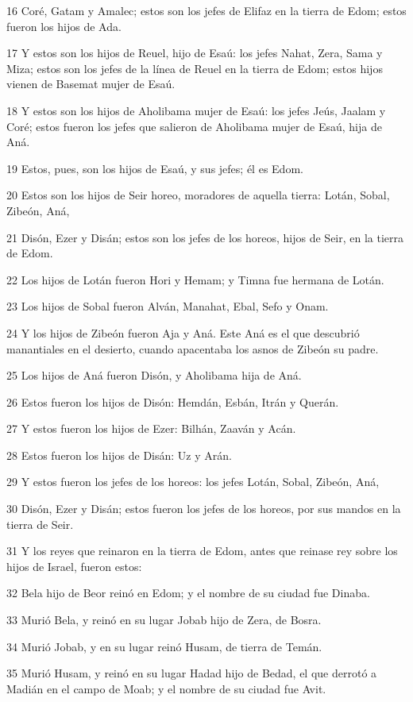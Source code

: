 \par 16 Coré, Gatam y Amalec; estos son los jefes de Elifaz en la tierra de Edom; estos fueron los hijos de Ada.
\par 17 Y estos son los hijos de Reuel, hijo de Esaú: los jefes Nahat, Zera, Sama y Miza; estos son los jefes de la línea de Reuel en la tierra de Edom; estos hijos vienen de Basemat mujer de Esaú.
\par 18 Y estos son los hijos de Aholibama mujer de Esaú: los jefes Jeús, Jaalam y Coré; estos fueron los jefes que salieron de Aholibama mujer de Esaú, hija de Aná.
\par 19 Estos, pues, son los hijos de Esaú, y sus jefes; él es Edom.
\par 20 Estos son los hijos de Seir horeo, moradores de aquella tierra: Lotán, Sobal, Zibeón, Aná,
\par 21 Disón, Ezer y Disán; estos son los jefes de los horeos, hijos de Seir, en la tierra de Edom.
\par 22 Los hijos de Lotán fueron Hori y Hemam; y Timna fue hermana de Lotán.
\par 23 Los hijos de Sobal fueron Alván, Manahat, Ebal, Sefo y Onam.
\par 24 Y los hijos de Zibeón fueron Aja y Aná. Este Aná es el que descubrió manantiales en el desierto, cuando apacentaba los asnos de Zibeón su padre.
\par 25 Los hijos de Aná fueron Disón, y Aholibama hija de Aná.
\par 26 Estos fueron los hijos de Disón: Hemdán, Esbán, Itrán y Querán.
\par 27 Y estos fueron los hijos de Ezer: Bilhán, Zaaván y Acán.
\par 28 Estos fueron los hijos de Disán: Uz y Arán.
\par 29 Y estos fueron los jefes de los horeos: los jefes Lotán, Sobal, Zibeón, Aná,
\par 30 Disón, Ezer y Disán; estos fueron los jefes de los horeos, por sus mandos en la tierra de Seir.
\par 31 Y los reyes que reinaron en la tierra de Edom, antes que reinase rey sobre los hijos de Israel, fueron estos:
\par 32 Bela hijo de Beor reinó en Edom; y el nombre de su ciudad fue Dinaba.
\par 33 Murió Bela, y reinó en su lugar Jobab hijo de Zera, de Bosra.
\par 34 Murió Jobab, y en su lugar reinó Husam, de tierra de Temán.
\par 35 Murió Husam, y reinó en su lugar Hadad hijo de Bedad, el que derrotó a Madián en el campo de Moab; y el nombre de su ciudad fue Avit.
